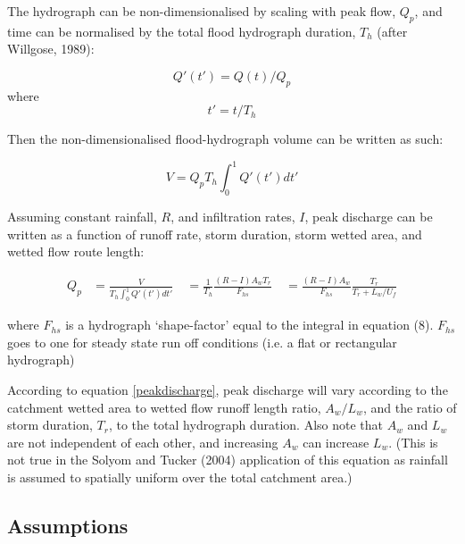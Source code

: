 \documentclass[12pt,oneside,PhD]{muthesis}
\begin{document}
The hydrograph can be non-dimensionalised by scaling with peak flow, \(Q_p\), and time can be normalised by the total flood hydrograph duration, \(T_h\) (after Willgose, 1989):

\begin{equation}
Q'(t') = Q(t)/Q_p
\end{equation}
where
\begin{equation}
t' = t/T_h
\end{equation}

Then the non-dimensionalised flood-hydrograph volume can be written as such:

\begin{equation}
V = Q_p T_h \int_{0}^{1} Q'(t') dt'
\end{equation}

Assuming constant rainfall, \(R\), and infiltration rates, \(I\), peak discharge can be written as a function of runoff rate, storm duration, storm wetted area, and wetted flow route length:


\begin{align}
\label{peakdischarge}
Q_p &= \frac{V}{T_h \int_{0}^{1} Q'(t') dt'} \
    &= \frac{1}{T_h} \frac{(R-I) A_w T_r}{F_{hs}} \
    &= \frac{(R-I)A_w}{F_{hs}} \frac{T_r}{T_r + L_w/U_f} 
\end{align}

where \(F_{hs}\) is a hydrograph `shape-factor' equal to the integral in equation (8). \(F_{hs}\) goes to one for steady state run off conditions (i.e. a flat or rectangular hydrograph)
 
According to equation \ref{peakdischarge}, peak discharge will vary according to the catchment wetted area to wetted flow runoff length ratio, \(A_w/L_w\), and the ratio of storm duration, \(T_r\), to the total hydrograph duration. Also note that \(A_w\) and \(L_w\) are not independent of each other, and increasing \(A_w\) can increase \(L_w\). (This is not true in the Solyom and Tucker (2004) application of this equation as rainfall is assumed to spatially uniform over the total catchment area.)

\subsection{Assumptions}
\end{document}
